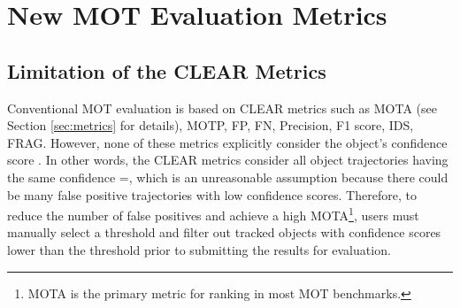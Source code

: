 \documentclass[letterpaper, 10 pt, conference]{ieeeconf}
\begin{document}
\vspace{-0.1cm}
\section{New MOT Evaluation Metrics}
\subsection{Limitation of the CLEAR Metrics}

Conventional MOT evaluation is based on CLEAR metrics \cite{Bernardin2008} such as MOTA (see Section \ref{sec:metrics} for details), MOTP, FP, FN, Precision, F1 score, IDS, FRAG. However, none of these metrics explicitly consider the object's confidence score . In other words, the CLEAR metrics consider all object trajectories having the same confidence =, which is an unreasonable assumption because there could be many false positive trajectories with low confidence scores. Therefore, to reduce the number of false positives and achieve a high MOTA\footnote{MOTA is the primary metric for ranking in most MOT benchmarks.}, users must manually select a threshold and filter out tracked objects with confidence scores lower than the threshold prior to submitting the results for evaluation.
\end{document}
